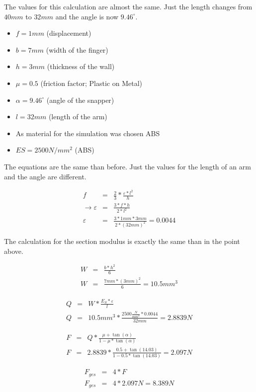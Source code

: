 \documentclass[a4paper,12pt]{scrreprt}
\begin{document}
The values for this calculation are almost the same. Just the length changes from $40mm$ to $32mm$ and the angle is now $9.46^{\circ}$.
\begin{itemize}
\item $f = 1 mm$ (displacement)
\item $b = 7 mm$ (width of the finger)
\item $h = 3 mm$ (thickness of the wall)
\item $ \mu = 0.5$ (friction factor; Plastic on Metal)
\item $ \alpha = 9.46^{\circ}$ (angle of the snapper)
\item $l = 32 mm$ (length of the arm)
\item As material for the simulation was chosen  ABS
\item $ES = 2500 N/mm^{2}$ (ABS)
\end{itemize}

The equations are the same than before. Just the values for the length of an arm and the angle are different.

\begin{eqnarray}
f &=& \frac{2}{3}*\frac{\varepsilon*l^{2}}{h}\\
\rightarrow \varepsilon &=& \frac{3*f*h}{2*l^{2}}\\
\varepsilon &=& \frac{3*1mm*3mm}{2*(32mm)^{2}} = 0.0044
\end{eqnarray}

The calculation for the section modulus is exactly the same than in the point above.

\begin{eqnarray}
W &=& \frac{b*h^{2}}{6}\\
W &=& \frac{7mm*(3mm)^{2}}{6} = 10.5 mm^{3}
\end{eqnarray}

\begin{eqnarray}
Q &=& W*\frac{E_{S}*\varepsilon}{l}\\ 
Q &=& 10.5mm^{3}* \frac{2500\frac{N}{mm^{2}}*0.0044}{32 mm} = 2.8839 N
\end{eqnarray}

\begin{eqnarray}
F &=& Q*\frac{\mu + \tan (\alpha)}{1 - \mu * \tan (\alpha)}\\
F &=& 2.8839*\frac{0.5 + \tan(14.03)}{1 - 0.5 * \tan(14.03)} = 2.097 N
\end{eqnarray}

\begin{eqnarray}
F_{ges} &=& 4 * F\\
F_{ges} &=& 4 * 2.097N = 8.389 N
\end{eqnarray}
\end{document}

